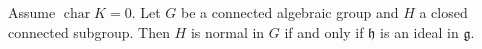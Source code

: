 Assume $\operatorname{char} K = 0$. Let $G$ be a connected algebraic group and $H$ a closed connected subgroup. Then $H$ is normal in $G$ if and only if $\mathfrak{h}$ is an ideal in $\mathfrak{g}$.
